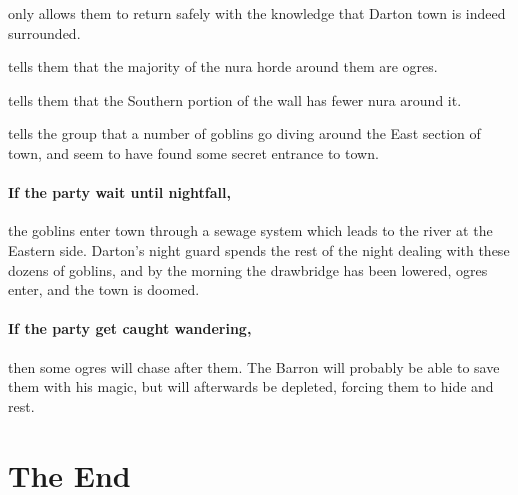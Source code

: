 \begin{multicols}{2}
\setcounter{list}{-1}
\begin{list}{\addtocounter{list}{1}\textbf{Margin }:}{\raggedleft}

	\item{only allows them to return safely with the knowledge that Darton town is indeed surrounded.}
	\item{tells them that the majority of the nura horde around them are ogres.}
	\item{tells them that the Southern portion of the wall has fewer nura around it.}
	\item{tells the group that a number of goblins go diving around the East section of town, and seem to have found some secret entrance to town.}
\end{list}

\paragraph{If the party wait until nightfall,}
the goblins enter town through a sewage system which leads to the river at the Eastern side.
Darton's night guard spends the rest of the night dealing with these dozens of goblins, and by the morning the drawbridge has been lowered, ogres enter, and the town is doomed.

\paragraph{If the party get caught wandering,}
then some ogres will chase after them.
The Barron will probably be able to save them with his magic, but will afterwards be depleted, forcing them to hide and rest.

\ogre

\end{multicols}

\section{The End}

